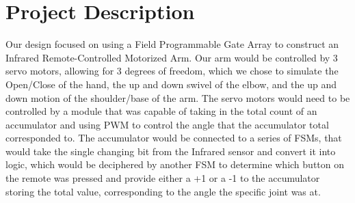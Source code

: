 \documentclass[
    a4paper, %
	12pt, %
    ]{CSSullivanBusinessReport}
\begin{document}


\bigskip
\begin{twothirdswidth} %
	\tableofcontents %
\end{twothirdswidth}

\newpage


\section{Project Description} %

Our design focused on using a Field Programmable Gate Array to construct an Infrared Remote-Controlled Motorized Arm. Our arm would be controlled by 3 servo motors, allowing for 3 degrees of freedom, which we chose to simulate the Open/Close of the hand, the up and down swivel of the elbow, and the up and down motion of the shoulder/base of the arm. The servo motors would need to be controlled by a module that was capable of taking in the total count of an accumulator and using PWM to control the angle that the accumulator total corresponded to. The accumulator would be connected to a series of FSMs, that would take the single changing bit from the Infrared sensor and convert it into logic, which would be deciphered by another FSM to determine which button on the remote was pressed and provide either a +1 or a -1 to the accumulator storing the total value, corresponding to the angle the specific joint was at.
\end{document}
